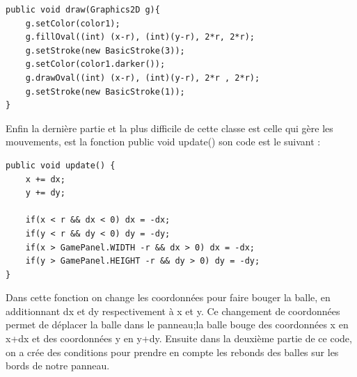 \documentclass{article}
\begin{document}
\begin{verbatim}
public void draw(Graphics2D g){
    g.setColor(color1);
    g.fillOval((int) (x-r), (int)(y-r), 2*r, 2*r);
    g.setStroke(new BasicStroke(3));
    g.setColor(color1.darker());
    g.drawOval((int) (x-r), (int)(y-r), 2*r , 2*r);
    g.setStroke(new BasicStroke(1));
}
\end{verbatim}

Enfin la dernière partie et la plus difficile de cette classe est celle qui gère les mouvements, est la fonction public void update()
son code est le suivant :

\begin{verbatim}
public void update() {
    x += dx;
    y += dy;	
	
    if(x < r && dx < 0) dx = -dx;
    if(y < r && dy < 0) dy = -dy;
    if(x > GamePanel.WIDTH -r && dx > 0) dx = -dx;
    if(y > GamePanel.HEIGHT -r && dy > 0) dy = -dy;
}
\end{verbatim}
Dans cette fonction on change les coordonnées pour faire bouger la balle, en additionnant  dx et dy respectivement à x et y. Ce changement de coordonnées permet de déplacer la balle dans le panneau;la balle bouge des coordonnées x en x+dx et des coordonnées y en y+dy. Ensuite dans la deuxième partie de ce code, on a crée des conditions pour prendre en compte les rebonds des balles sur les bords de notre panneau.
\end{document}
